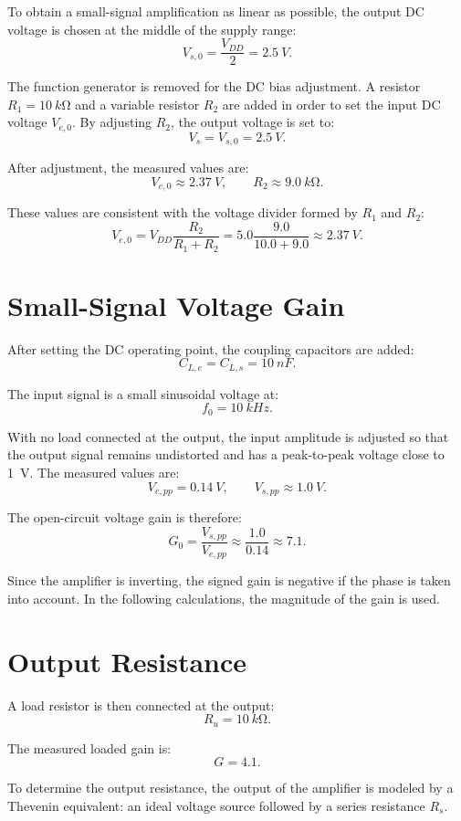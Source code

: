 \documentclass[11pt,a4paper]{article}
\begin{document}
To obtain a small-signal amplification as linear as possible, the output DC voltage is chosen at the middle of the supply range:
\[
V_{s,0}=\frac{V_{DD}}{2}=\SI{2.5}{V}.
\]

The function generator is removed for the DC bias adjustment. A resistor $R_1=\SI{10}{k\ohm}$ and a variable resistor $R_2$ are added in order to set the input DC voltage $V_{e,0}$. By adjusting $R_2$, the output voltage is set to:
\[
V_s=V_{s,0}=\SI{2.5}{V}.
\]

After adjustment, the measured values are:
\[
V_{e,0}\approx \SI{2.37}{V}, \qquad R_2\approx \SI{9.0}{k\ohm}.
\]

These values are consistent with the voltage divider formed by $R_1$ and $R_2$:
\[
V_{e,0}=V_{DD}\frac{R_2}{R_1+R_2}
=5.0\frac{9.0}{10.0+9.0}
\approx \SI{2.37}{V}.
\]

\section{Small-Signal Voltage Gain}

After setting the DC operating point, the coupling capacitors are added:
\[
C_{L,e}=C_{L,s}=\SI{10}{nF}.
\]

The input signal is a small sinusoidal voltage at:
\[
f_0=\SI{10}{kHz}.
\]

With no load connected at the output, the input amplitude is adjusted so that the output signal remains undistorted and has a peak-to-peak voltage close to \SI{1}{V}. The measured values are:
\[
V_{e,pp}=\SI{0.14}{V}, \qquad V_{s,pp}\approx \SI{1.0}{V}.
\]

The open-circuit voltage gain is therefore:
\[
G_0=\frac{V_{s,pp}}{V_{e,pp}}
\approx \frac{1.0}{0.14}
\approx 7.1.
\]

Since the amplifier is inverting, the signed gain is negative if the phase is taken into account. In the following calculations, the magnitude of the gain is used.

\section{Output Resistance}

A load resistor is then connected at the output:
\[
R_u=\SI{10}{k\ohm}.
\]

The measured loaded gain is:
\[
G=4.1.
\]

To determine the output resistance, the output of the amplifier is modeled by a Thevenin equivalent: an ideal voltage source followed by a series resistance $R_s$.
\end{document}
